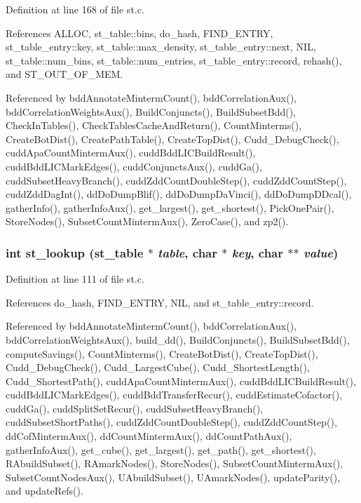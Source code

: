 Definition at line 168 of file st.c.

References ALLOC, st\_\-table::bins, do\_\-hash, FIND\_\-ENTRY, st\_\-table\_\-entry::key, st\_\-table::max\_\-density, st\_\-table\_\-entry::next, NIL, st\_\-table::num\_\-bins, st\_\-table::num\_\-entries, st\_\-table\_\-entry::record, rehash(), and ST\_\-OUT\_\-OF\_\-MEM.

Referenced by bdd\-Annotate\-Minterm\-Count(), bdd\-Correlation\-Aux(), bdd\-Correlation\-Weights\-Aux(), Build\-Conjuncts(), Build\-Subset\-Bdd(), Check\-In\-Tables(), Check\-Tables\-Cache\-And\-Return(), Count\-Minterms(), Create\-Bot\-Dist(), Create\-Path\-Table(), Create\-Top\-Dist(), Cudd\_\-Debug\-Check(), cudd\-Apa\-Count\-Minterm\-Aux(), cudd\-Bdd\-LICBuild\-Result(), cudd\-Bdd\-LICMark\-Edges(), cudd\-Conjuncts\-Aux(), cudd\-Ga(), cudd\-Subset\-Heavy\-Branch(), cudd\-Zdd\-Count\-Double\-Step(), cudd\-Zdd\-Count\-Step(), cudd\-Zdd\-Dag\-Int(), dd\-Do\-Dump\-Blif(), dd\-Do\-Dump\-Da\-Vinci(), dd\-Do\-Dump\-DDcal(), gather\-Info(), gather\-Info\-Aux(), get\_\-largest(), get\_\-shortest(), Pick\-One\-Pair(), Store\-Nodes(), Subset\-Count\-Minterm\-Aux(), Zero\-Case(), and zp2().
\subsubsection{\setlength{\rightskip}{0pt plus 5cm}int st\_\-lookup (\bf{st\_\-table} $\ast$ {\em table}, char $\ast$ {\em key}, char $\ast$$\ast$ {\em value})}\label{st_8c_557d860b11aff620a96b6addcf836d81}




Definition at line 111 of file st.c.

References do\_\-hash, FIND\_\-ENTRY, NIL, and st\_\-table\_\-entry::record.

Referenced by bdd\-Annotate\-Minterm\-Count(), bdd\-Correlation\-Aux(), bdd\-Correlation\-Weights\-Aux(), build\_\-dd(), Build\-Conjuncts(), Build\-Subset\-Bdd(), compute\-Savings(), Count\-Minterms(), Create\-Bot\-Dist(), Create\-Top\-Dist(), Cudd\_\-Debug\-Check(), Cudd\_\-Largest\-Cube(), Cudd\_\-Shortest\-Length(), Cudd\_\-Shortest\-Path(), cudd\-Apa\-Count\-Minterm\-Aux(), cudd\-Bdd\-LICBuild\-Result(), cudd\-Bdd\-LICMark\-Edges(), cudd\-Bdd\-Transfer\-Recur(), cudd\-Estimate\-Cofactor(), cudd\-Ga(), cudd\-Split\-Set\-Recur(), cudd\-Subset\-Heavy\-Branch(), cudd\-Subset\-Short\-Paths(), cudd\-Zdd\-Count\-Double\-Step(), cudd\-Zdd\-Count\-Step(), dd\-Cof\-Minterm\-Aux(), dd\-Count\-Minterm\-Aux(), dd\-Count\-Path\-Aux(), gather\-Info\-Aux(), get\_\-cube(), get\_\-largest(), get\_\-path(), get\_\-shortest(), RAbuild\-Subset(), RAmark\-Nodes(), Store\-Nodes(), Subset\-Count\-Minterm\-Aux(), Subset\-Count\-Nodes\-Aux(), UAbuild\-Subset(), UAmark\-Nodes(), update\-Parity(), and update\-Refs().

